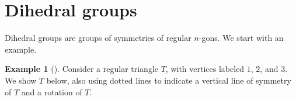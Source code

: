 \documentclass[10pt,]{book}
\theoremstyle{plain}
\theoremstyle{definition}
\theoremstyle{definition}
\theoremstyle{definition}
\newtheorem{example}[theorem]{Example}
\theoremstyle{definition}
\numberwithin{equation}{section}
\newlength{\panelmax}
\begin{document}
\section[{Dihedral groups}]{Dihedral groups}\label{dihedralgps}
Dihedral groups are groups of symmetries of regular \(n\)-gons. We start with an example.%
\begin{example}[]\label{D3}
Consider a regular triangle \(T\), with vertices labeled \(1\), \(2\), and \(3\). We show \(T\) below, also using dotted lines to indicate a vertical line of symmetry of \(T\) and a rotation of \(T\).%
{%
\setlength{\panelmax}{0pt}
\newsavebox{\panelboxFimage}
\begin{lrbox}{\panelboxFimage}
\end{lrbox}}
\end{example}
\end{document}
